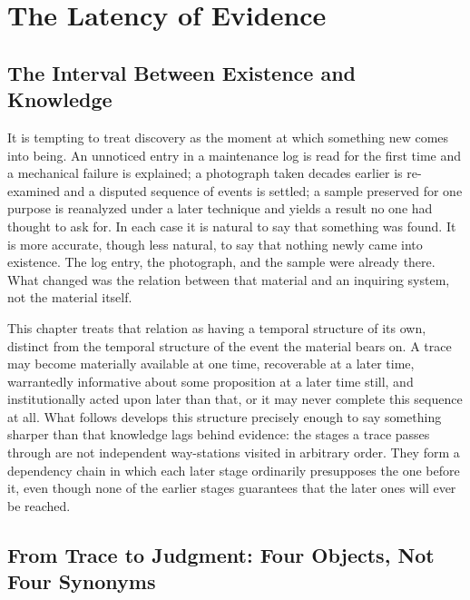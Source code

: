 
\chapter{The Latency of Evidence}
\label{ch:ch01-latency-of-evidence}
\section{The Interval Between Existence and Knowledge}

It is tempting to treat discovery as the moment at which something new comes into being. An unnoticed entry in a maintenance log is read for the first time and a mechanical failure is explained; a photograph taken decades earlier is re-examined and a disputed sequence of events is settled; a sample preserved for one purpose is reanalyzed under a later technique and yields a result no one had thought to ask for. In each case it is natural to say that something was found. It is more accurate, though less natural, to say that nothing newly came into existence. The log entry, the photograph, and the sample were already there. What changed was the relation between that material and an inquiring system, not the material itself.

This chapter treats that relation as having a temporal structure of its own, distinct from the temporal structure of the event the material bears on. A trace may become materially available at one time, recoverable at a later time, warrantedly informative about some proposition at a later time still, and institutionally acted upon later than that, or it may never complete this sequence at all. What follows develops this structure precisely enough to say something sharper than that knowledge lags behind evidence: the stages a trace passes through are not independent way-stations visited in arbitrary order. They form a dependency chain in which each later stage ordinarily presupposes the one before it, even though none of the earlier stages guarantees that the later ones will ever be reached.

\section{From Trace to Judgment: Four Objects, Not Four Synonyms}

